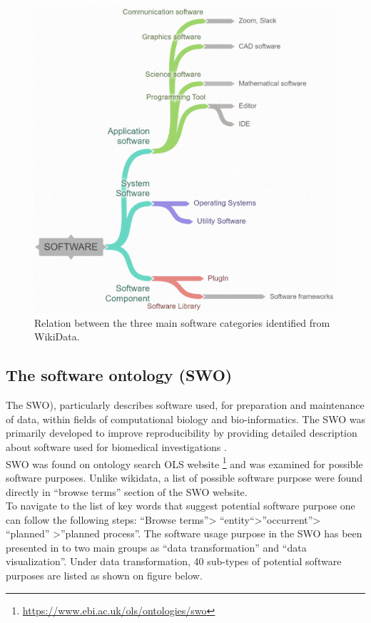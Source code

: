 \begin{figure}[htbp]
	\centering
	\includegraphics[width=.73\textwidth]{4.graphics/figures/ch_3/chart}
	\caption{Relation between the three main software categories identified from WikiData.}
	\label{fig:chapter03:setup}
\end{figure}


\subsection{The software ontology (SWO)}
\label{subsec:purpose:ontologies:SWO}

The \ac{SWO}), particularly describes software used, for preparation and maintenance of data, within fields of computational biology and bio-informatics.  The \ac{SWO} was primarily developed to improve reproducibility by providing detailed description about software used for biomedical investigations \citep{malone2014software}. \\

\ac{SWO} was found on ontology search \ac{OLS} website \footnote{\url{https://www.ebi.ac.uk/ols/ontologies/swo}} and was examined for possible software purposes. Unlike wikidata, a list of possible software purpose were found directly in “browse terms” section of the SWO website.  \\

To navigate to the list of key words that suggest potential software purpose one can follow the following steps: “Browse terms”> “entity“>”occurrent”> “planned” >”planned process”.  The software usage purpose in the SWO has been presented in to two main groups as “data transformation” and “data visualization”.  Under data transformation, 40 sub-types of potential software purposes are listed as shown on figure below. \\



